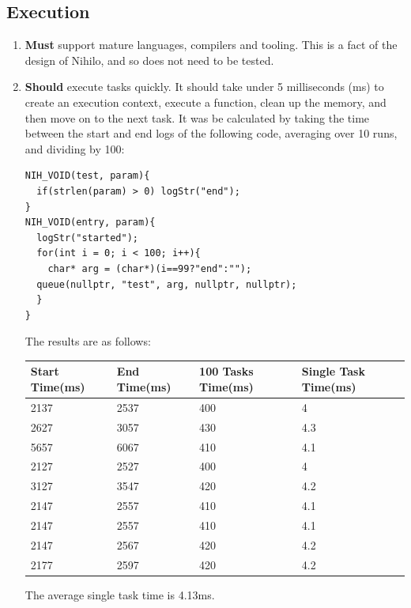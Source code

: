 \documentclass{article}
\begin{document}
\subsection{Execution}
\begin{enumerate}
\item \textbf{Must} support mature languages, compilers and tooling. This is a fact of the design of Nihilo, and so does not need to be tested.
\item \textbf{Should} execute tasks quickly. It should take under 5 milliseconds (ms) to create an execution context, execute a function, clean up the memory, and then move on to the next task. It was be calculated by taking the time between the start and end logs of the following code, averaging over 10 runs, and dividing by 100:
\begin{tcolorbox}[colback=white,grow to left by=2.5mm,grow to right by=2.5mm,left*=0mm,right*=0mm,sharp corners]
\begin{verbatim}
NIH_VOID(test, param){
  if(strlen(param) > 0) logStr("end");
}
NIH_VOID(entry, param){
  logStr("started");
  for(int i = 0; i < 100; i++){
    char* arg = (char*)(i==99?"end":"");
  queue(nullptr, "test", arg, nullptr, nullptr);
  }
}
\end{verbatim}
\end{tcolorbox}

The results are as follows:
\begin{table}[H]
\begin{tabular}{|l|l|l|l|}
\hline
Start Time(ms)		&End Time(ms)		&100 Tasks Time(ms)		&Single Task Time(ms)		\\ \hline
2137							&2537						&400    							&4\\ \hline
2627							&3057						&430	    						&4.3\\ \hline
5657							&6067						&410		    					&4.1\\ \hline
2127							&2527						&400			    				&4\\ \hline
3127							&3547						&420				    			&4.2\\ \hline
2147							&2557						&410					    		&4.1\\ \hline
2147							&2557						&410						    	&4.1\\ \hline
2147							&2567						&420						    	&4.2\\ \hline
2177							&2597						&420							    &4.2 \\ \hline
\end{tabular}
\end{table}

The average single task time is 4.13ms.

\end{enumerate}
\end{document}
